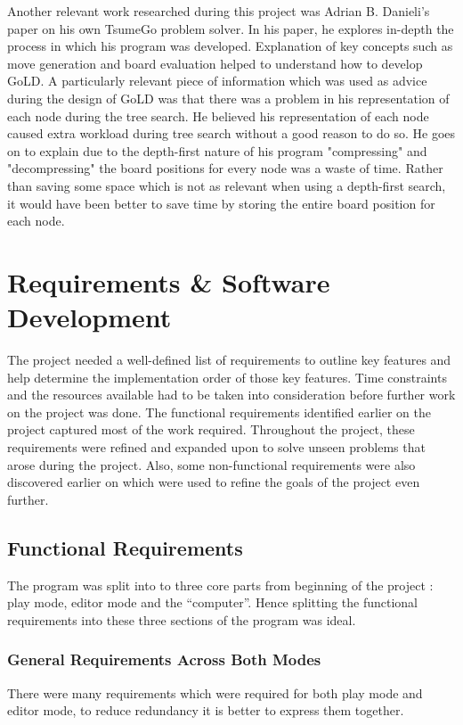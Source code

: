 \documentclass{l4proj}
\begin{document}
Another relevant work researched during this project was Adrian B. Danieli's paper \cite{Adrian2010} on his own TsumeGo problem solver. In his paper, he explores in-depth the process in which his program was developed. Explanation of key concepts such as move generation and board evaluation helped to understand how to develop GoLD. A particularly relevant piece of information which was used as advice during the design of GoLD was that there was a problem in his representation of each node during the tree search. He believed his representation of each node caused extra workload during tree search without a good reason to do so. He goes on to explain due to the depth-first nature of his program "compressing" and "decompressing" the board positions for every node was a waste of time. Rather than saving some space which is not as relevant when using a depth-first search, it would have been better to save time by storing the entire board position for each node.








\chapter{Requirements \& Software Development}

The project needed a well-defined list of requirements to outline key features and help determine the implementation order of those key features. Time constraints and the resources available had to be taken into consideration before further work on the project was done. The functional requirements identified earlier on the project captured most of the work required. Throughout the project, these requirements were refined and expanded upon to solve unseen problems that arose during the project. Also, some non-functional requirements were also discovered earlier on which were used to refine the goals of the project even further.

\section{Functional Requirements}

The program was split into to three core parts from beginning of the project : play mode, editor mode and the “computer”. Hence splitting the functional requirements into these three sections of the program was ideal.

\subsection{General Requirements Across Both Modes}
There were many requirements which were required for both play mode and editor mode, to reduce redundancy it is better to express them together.
\end{document}
